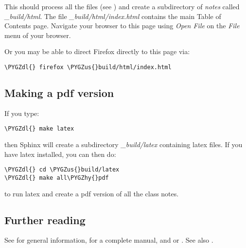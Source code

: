 \documentclass[letterpaper,10pt,english]{sphinxmanual}
\def\PYGZus{\char`\_}
\def\PYGZdl{\char`\$}
\def\PYGZhy{\char`\-}
\begin{document}
This should process all the files (see {\hyperref[makefiles:makefiles]{}}) and create a
subdirectory of \emph{notes} called \emph{\_build/html}.  The file
\emph{\_build/html/index.html} contains the main Table of Contents page.
Navigate your browser to this page using \emph{Open File} on the \emph{File} menu of
your browser.

Or you may be able to direct Firefox directly to this page via:

\begin{Verbatim}[commandchars=\\\{\}]
\PYGZdl{} firefox \PYGZus{}build/html/index.html
\end{Verbatim}


\subsection{Making a pdf version}
\label{sphinx:making-a-pdf-version}
If you type:

\begin{Verbatim}[commandchars=\\\{\}]
\PYGZdl{} make latex
\end{Verbatim}

then Sphinx will create a subdirectory \emph{\_build/latex} containing latex
files.  If you have latex installed, you can then do:

\begin{Verbatim}[commandchars=\\\{\}]
\PYGZdl{} cd \PYGZus{}build/latex
\PYGZdl{} make all\PYGZhy{}pdf
\end{Verbatim}

to run latex and create a pdf version of all the class notes.


\subsection{Further reading}
\label{sphinx:further-reading}
See \label{sphinx:id11}{\hyperref[biblio:sphinx]{\crossref{{[}sphinx{]}}}} for general information, \label{sphinx:id12}{\hyperref[biblio:sphinx\string-documentation]{}} for a
complete manual, and \label{sphinx:id13}{\hyperref[biblio:sphinx\string-rst]{}} or \label{sphinx:id14}{\hyperref[biblio:rst\string-documentation]{}}.
See also \label{sphinx:id15}{\hyperref[biblio:sphinx\string-cheatsheet]{}}.
\end{document}
